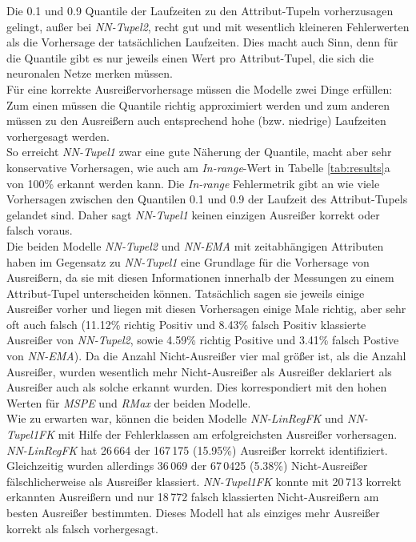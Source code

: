 \documentclass[
	12pt,
	a4paper,
	BCOR10mm,
	DIV14,
	listof=totoc,
	bibliography=totoc,
	headsepline
]{scrreprt}
\begin{document}
Die 0.1 und 0.9 Quantile der Laufzeiten zu den Attribut-Tupeln vorherzusagen gelingt, außer bei \textit{NN-Tupel2}, recht gut und mit wesentlich kleineren Fehlerwerten als die Vorhersage der tatsächlichen Laufzeiten.
Dies macht auch Sinn, denn für die Quantile gibt es nur jeweils einen Wert pro Attribut-Tupel, die sich die neuronalen Netze \glqq merken \grqq{}müssen.\\
Für eine korrekte Ausreißervorhersage müssen die Modelle zwei Dinge erfüllen:\\
Zum einen müssen die Quantile richtig approximiert werden und zum anderen müssen zu den Ausreißern auch entsprechend hohe (bzw. niedrige) Laufzeiten vorhergesagt werden.\\
So erreicht \textit{NN-Tupel1} zwar eine gute Näherung der Quantile, macht aber sehr konservative Vorhersagen, wie auch am \textit{In-range}-Wert in Tabelle \ref{tab:results}a von 100\% erkannt werden kann.
Die \textit{In-range} Fehlermetrik gibt an wie viele Vorhersagen zwischen den Quantilen 0.1 und 0.9 der Laufzeit des Attribut-Tupels gelandet sind.
 Daher sagt \textit{NN-Tupel1} keinen einzigen Ausreißer korrekt oder falsch voraus.\\
Die beiden Modelle \textit{NN-Tupel2} und \textit{NN-EMA} mit zeitabhängigen Attributen haben im Gegensatz zu \textit{NN-Tupel1} eine Grundlage für die Vorhersage von Ausreißern, da sie mit diesen Informationen innerhalb der Messungen zu einem Attribut-Tupel unterscheiden können.
Tatsächlich sagen sie jeweils einige Ausreißer vorher und liegen mit diesen Vorhersagen einige Male richtig, aber sehr oft auch falsch (11.12\% richtig Positiv und 8.43\% falsch Positiv klassierte Ausreißer von \textit{NN-Tupel2}, sowie 4.59\% richtig Positive und 3.41\% falsch Postive von \textit{NN-EMA}).
Da die Anzahl Nicht-Ausreißer vier mal größer ist, als die Anzahl Ausreißer, wurden wesentlich mehr Nicht-Ausreißer als Ausreißer deklariert als Ausreißer auch als solche erkannt wurden. Dies korrespondiert mit den hohen Werten für \textit{MSPE} und \textit{RMax} der beiden Modelle.\\
Wie zu erwarten war, können die beiden Modelle \textit{NN-LinRegFK} und \textit{NN-Tupel1FK} mit Hilfe der Fehlerklassen am erfolgreichsten Ausreißer vorhersagen. 
\textit{NN-LinRegFK} hat 26\,664 der 167\,175 (15.95\%) Ausreißer korrekt identifiziert.
Gleichzeitig wurden allerdings 36\,069 der 67\,0425 (5.38\%) Nicht-Ausreißer fälschlicherweise als Ausreißer klassiert.
\textit{NN-Tupel1FK} konnte mit 20\,713 korrekt erkannten Ausreißern und nur 18\,772 falsch klassierten Nicht-Ausreißern am besten Ausreißer bestimmten. Dieses Modell hat als einziges mehr Ausreißer korrekt als falsch vorhergesagt.\medskip
\end{document}
